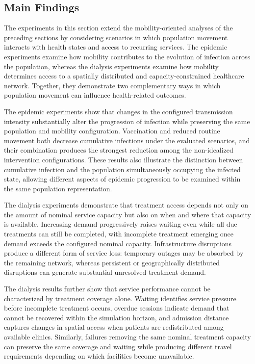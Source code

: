 \subsection{Main Findings}
\label{sec:health_results_findings}

The experiments in this section extend the mobility-oriented analyses of the preceding sections by considering scenarios in which population movement interacts with health states and access to recurring services. The epidemic experiments examine how mobility contributes to the evolution of infection across the population, whereas the dialysis experiments examine how mobility determines access to a spatially distributed and capacity-constrained healthcare network. Together, they demonstrate two complementary ways in which population movement can influence health-related outcomes.

The epidemic experiments show that changes in the configured transmission intensity substantially alter the progression of infection while preserving the same population and mobility configuration. Vaccination and reduced routine movement both decrease cumulative infections under the evaluated scenarios, and their combination produces the strongest reduction among the non-idealized intervention configurations. These results also illustrate the distinction between cumulative infection and the population simultaneously occupying the infected state, allowing different aspects of epidemic progression to be examined within the same population representation.

The dialysis experiments demonstrate that treatment access depends not only on the amount of nominal service capacity but also on when and where that capacity is available. Increasing demand progressively raises waiting even while all due treatments can still be completed, with incomplete treatment emerging once demand exceeds the configured nominal capacity. Infrastructure disruptions produce a different form of service loss: temporary outages may be absorbed by the remaining network, whereas persistent or geographically distributed disruptions can generate substantial unresolved treatment demand.

The dialysis results further show that service performance cannot be characterized by treatment coverage alone. Waiting identifies service pressure before incomplete treatment occurs, overdue sessions indicate demand that cannot be recovered within the simulation horizon, and admission distance captures changes in spatial access when patients are redistributed among available clinics. Similarly, failures removing the same nominal treatment capacity can preserve the same coverage and waiting while producing different travel requirements depending on which facilities become unavailable.

